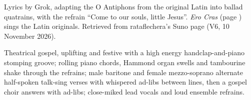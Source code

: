 
\label{sec:come-to-our-souls}
\begin{notes}
Lyrics by Grok, adapting the O Antiphons from the original Latin into ballad quatrains, with the refrain ``Come to our souls, little Jesus''. \emph{Ero Cras} (page \pageref{sec:ero-cras}) sings the Latin originals. Retrieved from rataflechera's Suno page (V6, 10 November 2026).
\end{notes}
\begin{style}
Theatrical gospel, uplifting and festive with a high energy handclap-and-piano stomping groove; rolling piano chords, Hammond organ swells and tambourine shake through the refrains; male baritone and female mezzo-soprano alternate half-spoken talk-sing verses with whispered ad-libs between lines, then a gospel choir answers with ad-libs; close-miked lead vocals and loud ensemble refrains.
\end{style}
